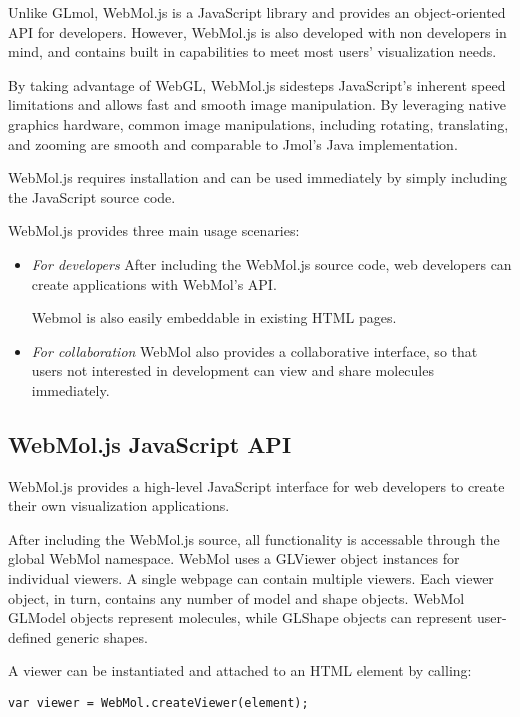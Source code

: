 \documentclass[]{bioinfo}
\begin{document}
Unlike GLmol, WebMol.js is a JavaScript library and provides an object-oriented API for developers.  However, WebMol.js is also developed with non developers in mind, and contains built in capabilities to meet most users' visualization needs.

By taking advantage of WebGL, WebMol.js sidesteps JavaScript's inherent speed limitations and allows fast and smooth image manipulation.  By leveraging native graphics hardware, common image manipulations, including rotating, translating, and zooming are smooth and comparable to Jmol's Java implementation.

WebMol.js requires installation and can be used immediately by simply including the JavaScript source code.

WebMol.js provides three main usage scenaries:

\begin{itemize}
\item \emph{For developers}
After including the WebMol.js source code, web developers can create applications with WebMol's API.

Webmol is also easily embeddable in existing HTML pages.

\item \emph{For collaboration}
WebMol also provides a collaborative interface, so that users not interested in development can view and share molecules immediately.

\end{itemize}

\subsection{WebMol.js JavaScript API}
WebMol.js provides a high-level JavaScript interface for web developers to create their own visualization applications. 

After including the WebMol.js source, all functionality is accessable through the global WebMol namespace. WebMol uses a GLViewer object instances for individual viewers.  A single webpage can contain multiple viewers.  Each viewer object, in turn, contains any number of model and shape objects.  WebMol GLModel objects represent molecules, while GLShape objects can represent user-defined generic shapes.

A viewer can be instantiated and attached to an HTML element by calling:

\begin{verbatim}
var viewer = WebMol.createViewer(element);
\end{verbatim}
\end{document}
